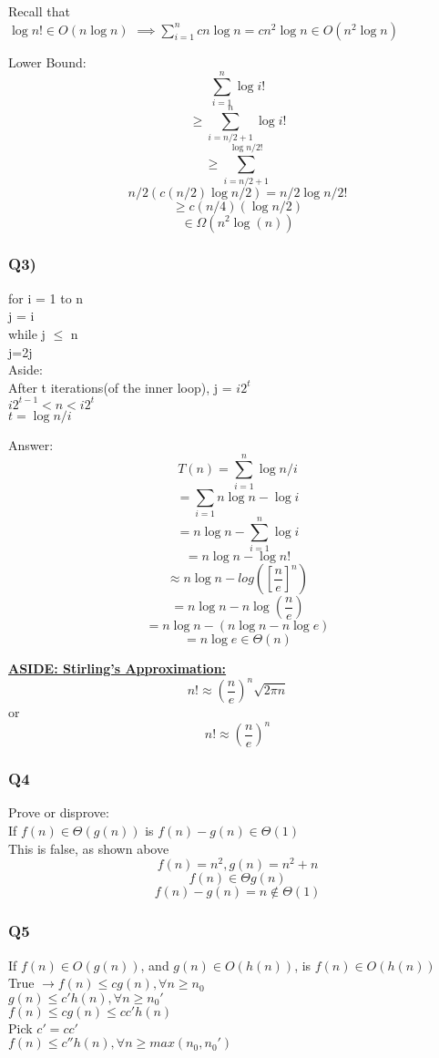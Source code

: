 \documentclass[12pt]{article}
\newcommand{\myt}[1]{\textbf{\underline{#1}}}
\begin{document}
	Recall that\\
	$\log{n!} \in O(n\log{n})$
	$ \implies \sum_{i = 1}^{n}cn\log{n} = cn^2\log{n} \in O(n^2\log{n})$
	
	Lower Bound:
	$$\sum_{i=1}^{n}\log{i!}$$
	$$\geq \sum_{i = n/2 + 1}^{n}\log{i!}$$
	$$\geq \sum_{i=n/2 + 1}^{\log{n/2!}}$$
	$$n/2(c(n/2)\log{n/2}) = n/2\log{n/2!}$$
	$$\geq c(n/4)(\log{n/2})$$
	$$\in \Omega(n^2\log(n))$$
	
	\subsubsection*{Q3)}
	for i = 1 to n\\
		j = i\\
			while j $\leq$ n\\
				j=2j\\
	
	Aside:\\
	After t iterations(of the inner loop), j = $i2^t$\\
	$i2^{t-1} < n < i2^t$\\
	$t = \log{n/i}$
	
	Answer:
	$$T(n) = \sum_{i = 1}^{n}\log{n/i}$$
	$$= \sum_{i = 1}{n}\log{n} - \log{i}$$
	$$= n\log{n} - \sum_{i = 1}^{n}\log{i}$$
	$$= n\log{n} - \log{n!}$$
	$$\approx n\log{n} - log([\frac{n}{e}]^n)$$
	$$= n\log{n} - n\log(\frac{n}{e})$$
	$$= n\log{n} - (n\log{n} - n\log{e})$$
	$$= n\log{e} \in \Theta(n)$$
	
	\myt{ASIDE: Stirling's Approximation:}\\
	$$n! \approx (\frac{n}{e})^n\sqrt{2\pi n}$$
	or
	$$n! \approx (\frac{n}{e})^n$$
	
	\subsubsection*{Q4}
	Prove or disprove:\\
	If $f(n) \in \Theta(g(n))$ is $f(n) - g(n) \in \Theta(1)$\\
	This is false, as shown above\\
	$$f(n) = n^2, g(n) = n^2 + n$$
	$$f(n) \in \Theta g(n)$$
	$$f(n)-g(n) = n \notin \Theta(1)$$
	
	\subsubsection*{Q5}
	If $f(n) \in O(g(n))$, and $g(n) \in O(h(n))$, is $f(n) \in O(h(n))$\\
	True $\rightarrow f(n) \leq cg(n), \forall n \geq n_0$\\
	$g(n) \leq c'h(n), \forall n \geq n_0'$\\
	$f(n) \leq cg(n) \leq cc'h(n)$\\
	Pick $c' = cc'$\\
	$f(n) \leq c''h(n), \forall n \geq max(n_0, n_0')$\\
	
\end{document}
